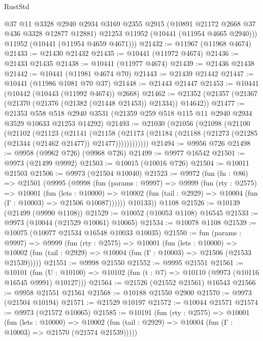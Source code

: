 \begin{lexlean}{RustStd}
\begin{coremodule}
        @37
        @11
        @3328
        @2940
        @2934
        @3169
        @2355
        @2915
        (@10891 @21172 @2668 @37 @436 @3328 @12877 @12881)
        @21253
        @11952
        (@10441 (@11954 @4665 @2940)))
      @11952
      (@10441 (@11954 @4659 @4671)))
@21432 := @11967 (@11968 @4674)
@21433 := @21430 @21432
@21435 := @10441 (@11972 @4674)
@21436 := @21433 @21435
@21438 := @10441 (@11977 @4674)
@21439 := @21436 @21438
@21442 := @10441 (@11981 @4674 @70)
@21443 := @21439 @21442
@21447 := @10441 (@11986 @1081 @70 @37)
@21448 := @21443 @21447
@21453 := @10441 (@10442 (@10443 (@11992 @4674)) @2668)
@21462 := @21352 (@21357 (@21367 (@21370 (@21376 (@21382 (@21448 @21453)) @21334)) @14642))
@21477 := @21353
    @558
    @518
    @2940
    @3531
    (@21359 @259 @518 @115 @11 @2940 @2934 @3529 @10633 @21253 @14292)
@21493 := @21030
    (@21056
      (@21098
        (@21100
          (@21102
            (@21123
              (@21141
                (@21158
                  (@21173
                    (@21184 (@21188 (@21273 (@21285 (@21344 (@21462 @21477)) @21477))))))))))))
@21494 := @9956 @726
@21498 := @9958 (@9962 @726) (@9968 @726)
@21499 := @9977 @16542
@21501 := @9973 (@21499 @9992)
@21503 := @10015 (@10016 @726)
@21504 := @10011 @21503
@21506 := @9973 (@21504 @10040)
@21523 := @9972
    (fun (fn : @86) =>
    @21501
      (@9995
        (@9998
          (fun (params : @9997) =>
          @9999
            (fun (rty : @2575) =>
            @10001
              (fun (lets : @10000) =>
              @10002 (fun (tail : @2929) => @10004 (fun (Γ : @10003) => @21506 @10087))))))
        @10133))
    @1108
@21526 := @10139 (@21499 (@9990 @1108))
@21529 := @10052 (@10053 @1108) @16545
@21533 := @9973 (@10044 (@21529 @10061) @10065)
@21534 := @10078 @1108
@21539 := @10075 (@10077 @21534 @16548 @10033 @10035)
@21550 := fun (params : @9997) =>
  @9999
    (fun (rty : @2575) =>
    @10001
      (fun (lets : @10000) =>
      @10002 (fun (tail : @2929) => @10004 (fun (Γ : @10003) => @21506 (@21533 @21539)))))
@21551 := @9998 @21550
@21552 := @9995 @21551
@21561 := @10101
    (fun (U : @10100) => @10102 (fun (t : @7) => @10110 (@9973 (@10116 @16545 @9991) @10127)))
@21564 := @21526 (@21552 @21561) @16543
@21566 := @9958 @21551 @21561
@21568 := @10188 @21550 @2900
@21570 := @9973 (@21504 @10194)
@21571 := @21529 @10197
@21572 := @10044 @21571
@21574 := @9973 (@21572 @10065)
@21585 := @10191
    (fun (rty : @2575) =>
    @10001
      (fun (lets : @10000) =>
      @10002 (fun (tail : @2929) => @10004 (fun (Γ : @10003) => @21570 (@21574 @21539)))))

\end{coremodule}
\end{lexlean}
